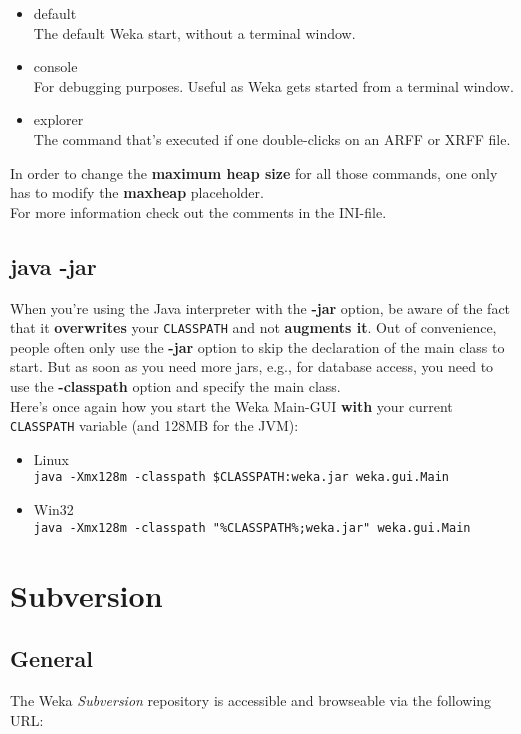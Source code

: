 \begin{itemize}
\item default\\ The default Weka start, without a terminal window.
\item console\\ For debugging purposes. Useful as Weka gets started from a terminal window.
\item explorer\\ The command that's executed if one double-clicks on an ARFF or XRFF file.
\end{itemize}

\noindent In order to change the \textbf{maximum heap size} for all those commands, one only has
to modify the \textbf{maxheap} placeholder.\\

\noindent For more information check out the comments in the INI-file.

\subsection{java -jar}

When you're using the Java interpreter with the \textbf{-jar} option,
be aware of the fact that it \textbf{overwrites} your \verb=CLASSPATH=
and not \textbf{augments it}. Out of convenience, people often only
use the \textbf{-jar} option to skip the declaration of the main class to
start. But as soon as you need more jars, e.g., for database access,
you need to use the \textbf{-classpath} option and specify the main class.\\

\noindent Here's once again how you start the Weka Main-GUI \textbf{with} your current \verb=CLASSPATH= variable (and 128MB for the JVM):

\begin{itemize}
\item Linux\\ \verb=java -Xmx128m -classpath $CLASSPATH:weka.jar weka.gui.Main=
\item Win32\\ \verb=java -Xmx128m -classpath "%CLASSPATH%;weka.jar" weka.gui.Main=
\end{itemize}

\section{Subversion}

\subsection{General}
The Weka \textit{Subversion} repository is accessible and browseable via the following URL:\\

